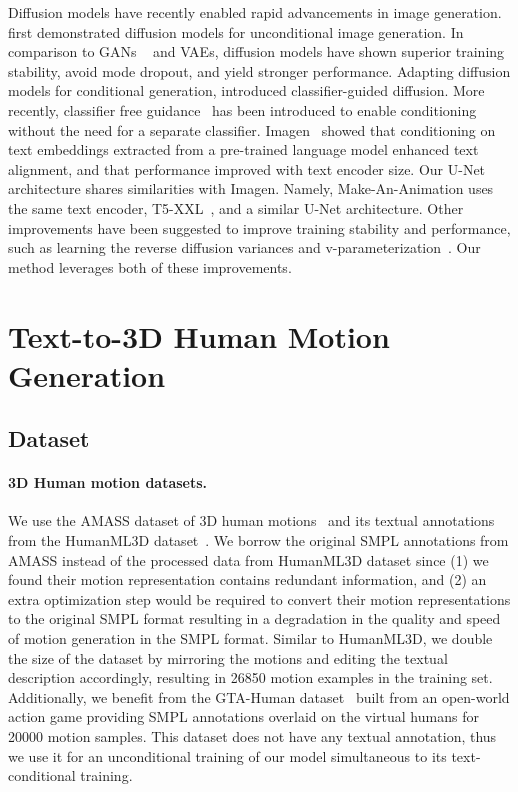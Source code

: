 \documentclass[10pt,twocolumn,letterpaper]{article}
\begin{document}
Diffusion models have recently enabled rapid advancements in image generation. \cite{ddpms} first demonstrated diffusion models for unconditional image generation. In comparison to GANs ~\cite{goodfellow2014} and VAEs, diffusion models have shown superior training stability, avoid mode dropout, and yield stronger performance. Adapting diffusion models for conditional generation, \cite{diff_beat_gans} introduced classifier-guided diffusion. More recently, classifier free guidance~\cite{cfg} has been introduced to enable conditioning without the need for a separate classifier. Imagen~\cite{Imagen} showed that conditioning on text embeddings extracted from a pre-trained language model enhanced text alignment, and that performance improved with text encoder size. Our U-Net architecture shares similarities with Imagen. Namely, Make-An-Animation uses the same text encoder, T5-XXL~\cite{t5_2020}, and a similar U-Net architecture. Other improvements have been suggested to improve training stability and performance, such as learning the reverse diffusion variances \cite{nichol2021improved} and v-parameterization~\cite{progdistill}. Our method leverages both of these improvements.

 
\section{Text-to-3D Human Motion Generation}

\subsection{Dataset}
\label{sec:mocap}

\paragraph{3D Human motion datasets.} We use the AMASS dataset of 3D human motions~\cite{AMASS:ICCV:2019} and its textual annotations from the HumanML3D dataset~\cite{HumanML3d}. We borrow the original SMPL annotations from AMASS instead of the processed data from HumanML3D dataset since (1) we found their motion representation contains redundant information, and (2) an extra optimization step would be required to convert their motion representations to the original SMPL format resulting in a degradation in the quality and speed of motion generation in the SMPL format. Similar to HumanML3D, we double the size of the dataset by mirroring the motions and editing the textual description accordingly, resulting in 26850 motion examples in the training set. Additionally, we benefit from the GTA-Human dataset~\cite{gtahuman} built from an open-world action game providing SMPL annotations overlaid on the virtual humans for 20000 motion samples. This dataset does not have any textual annotation, thus we use it for an unconditional training of our model simultaneous to its text-conditional training. 
\end{document}
